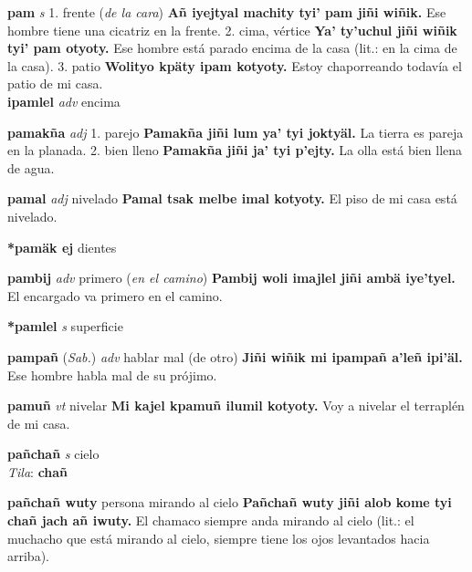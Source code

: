 \documentclass[10pt]{scrbook}
\newcommand{\entry}[1]{\textbf{#1}}
\newcommand{\onedefinition}[1]{#1.}
\newcommand{\partofspeech}[1]{\textit{#1}}
\newcommand{\spanishtranslation}[1]{#1}
\newcommand{\clarification}[1]{(\textit{#1})}
\newcommand{\cholexample}[1]{\textbf{#1}}
\newcommand{\exampletranslation}[1]{#1}
\newcommand{\dialectvariant}[1]{\\\textit{#1}:}
\newcommand{\dialectword}[1]{\textbf{#1}}
\newcommand{\relevantdialect}[1]{(\textit{#1})}
\newcommand{\secondaryentry}[1]{\\\textbf{#1}}
\newcommand{\secondpartofspeech}[1]{\textit{#1}}
\newcommand{\secondtranslation}[1]{#1}
\begin{document}
\begin{multicols}{2}
\entry{pam}
\partofspeech{s}
\onedefinition{1}
\spanishtranslation{frente}
\clarification{de la cara}
\cholexample{Añ iyejtyal machity tyi' pam jiñi wiñik.}
\exampletranslation{Ese hombre tiene una cicatriz en la frente.}
\onedefinition{2}
\spanishtranslation{cima, vértice}
\cholexample{Ya' ty'uchul jiñi wiñik tyi' pam otyoty.}
\exampletranslation{Ese hombre está parado encima de la casa (lit.: en la cima de la casa).}
\onedefinition{3}
\spanishtranslation{patio}
\cholexample{Wolityo kpäty ipam kotyoty.}
\exampletranslation{Estoy chaporreando todavía el patio de mi casa.}
\secondaryentry{ipamlel}
\secondpartofspeech{adv}
\secondtranslation{encima}

\entry{pamakña}
\partofspeech{adj}
\onedefinition{1}
\spanishtranslation{parejo}
\cholexample{Pamakña jiñi lum ya' tyi joktyäl.}
\exampletranslation{La tierra es pareja en la planada.}
\onedefinition{2}
\spanishtranslation{bien lleno}
\cholexample{Pamakña jiñi ja' tyi p'ejty.}
\exampletranslation{La olla está bien llena de agua.}

\entry{pamal}
\partofspeech{adj}
\spanishtranslation{nivelado}
\cholexample{Pamal tsak melbe imal kotyoty.}
\exampletranslation{El piso de mi casa está nivelado.}

\entry{*pamäk ej}
\spanishtranslation{dientes}

\entry{pambij}
\partofspeech{adv}
\spanishtranslation{primero}
\clarification{en el camino}
\cholexample{Pambij woli imajlel jiñi ambä iye'tyel.}
\exampletranslation{El encargado va primero en el camino.}

\entry{*pamlel}
\partofspeech{s}
\spanishtranslation{superficie}

\entry{pampañ}
\relevantdialect{Sab.}
\partofspeech{adv}
\spanishtranslation{hablar mal (de otro)}
\cholexample{Jiñi wiñik mi ipampañ a'leñ ipi'äl.}
\exampletranslation{Ese hombre habla mal de su prójimo.}

\entry{pamuñ}
\partofspeech{vt}
\spanishtranslation{nivelar}
\cholexample{Mi kajel kpamuñ ilumil kotyoty.}
\exampletranslation{Voy a nivelar el terraplén de mi casa.}

\entry{pañchañ}
\partofspeech{s}
\spanishtranslation{cielo}
\dialectvariant{Tila}
\dialectword{chañ}

\entry{pañchañ wuty}
\spanishtranslation{persona mirando al cielo}
\cholexample{Pañchañ wuty jiñi alob kome tyi chañ jach añ iwuty.}
\exampletranslation{El chamaco siempre anda mirando al cielo (lit.: el muchacho que está mirando al cielo, siempre tiene los ojos levantados hacia arriba).}


\end{multicols}
\end{document}
